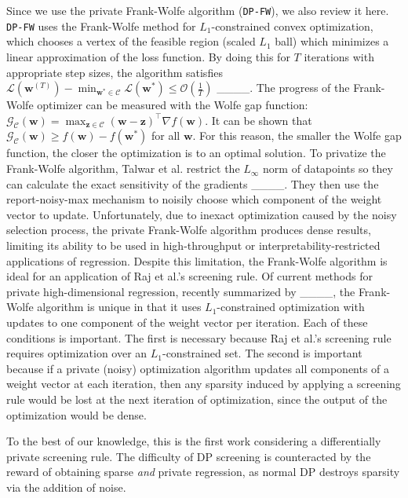 Since we use the private Frank-Wolfe algorithm (\texttt{DP-FW}), we also review it here. \texttt{DP-FW} uses the Frank-Wolfe method for $L_1$-constrained convex optimization, which chooses a vertex of the feasible region (scaled $L_1$ ball) which minimizes a linear approximation of the loss function. By doing this for $T$ iterations with appropriate step sizes, the algorithm satisfies $\mathcal{L}(\mathbf{w}^{(T)}) - \min_{\mathbf{w}^*  \in \mathcal{C}} \mathcal{L}(\mathbf{w}^*) \leq \mathcal{O}(\frac{1}{T})$ ____. The progress of the Frank-Wolfe optimizer can be measured with the Wolfe gap function: $\mathcal{G}_{\mathcal{C}}(\mathbf{w}) = \max_{\mathbf{z} \in \mathcal{C}} (\mathbf{w} - \mathbf{z})^{\top}\nabla f(\mathbf{w})$. It can be shown that $\mathcal{G}_{\mathcal{C}}(\mathbf{w}) \geq f(\mathbf{w}) - f(\mathbf{w}^*)$ for all $\mathbf{w}$. For this reason, the smaller the Wolfe gap function, the closer the optimization is to an optimal solution. To privatize the Frank-Wolfe algorithm, Talwar et al. restrict the $L_\infty$ norm of datapoints so they can calculate the exact sensitivity of the gradients ____. They then use the report-noisy-max mechanism to noisily choose which component of the weight vector to update. Unfortunately, due to inexact optimization caused by the noisy selection process, the private Frank-Wolfe algorithm produces dense results, limiting its ability to be used in high-throughput or interpretability-restricted applications of regression. Despite this limitation, the Frank-Wolfe algorithm is ideal for an application of Raj et al.'s screening rule. Of current methods for private high-dimensional regression, recently summarized by ____, the Frank-Wolfe algorithm is unique in that it uses $L_1$-constrained optimization with updates to one component of the weight vector per iteration. Each of these conditions is important. The first is necessary because Raj et al.'s screening rule requires optimization over an $L_1$-constrained set. The second is important because if a private (noisy) optimization algorithm updates all components of a weight vector at each iteration, then any sparsity induced by applying a screening rule would be lost at the next iteration of optimization, since the output of the optimization would be dense.

To the best of our knowledge, this is the first work considering a differentially private screening rule. The difficulty of DP screening is counteracted by the reward of obtaining sparse \textit{and} private regression, as normal DP destroys sparsity via the addition of noise.